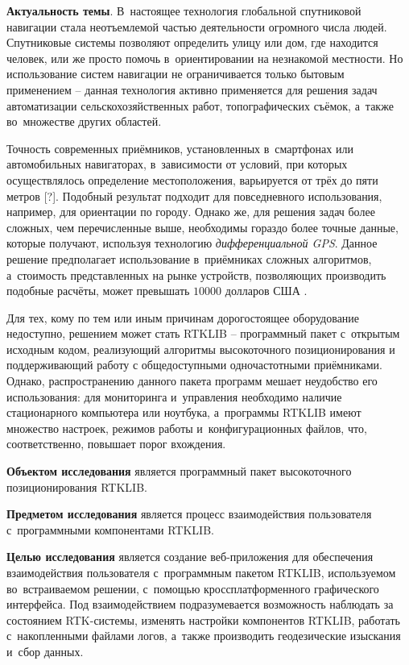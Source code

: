 
\textbf{Актуальность темы}. В~настоящее технология глобальной спутниковой навигации стала неотъемлемой частью деятельности огромного числа людей. Спутниковые системы позволяют определить улицу или дом, где находится человек, или же просто помочь в~ориентировании на незнакомой местности. Но использование систем навигации не ограничивается только бытовым применением -- данная технология активно применяется для решения задач автоматизации сельскохозяйственных работ, топографических съёмок, а~также во~множестве других областей.

Точность современных приёмников, установленных в~смартфонах или автомобильных навигаторах, в~зависимости от условий, при которых осуществлялось определение местоположения, варьируется от трёх до пяти метров [?]. Подобный результат подходит для повседневного использования, например, для ориентации по городу. Однако же, для решения задач более сложных, чем перечисленные выше, необходимы гораздо более точные данные, которые получают, используя технологию \textit{дифференциальной GPS}. Данное решение предполагает использование в~приёмниках сложных алгоритмов, а~стоимость представленных на рынке устройств, позволяющих производить подобные расчёты, может превышать $10000$ долларов США \cite{GEOOPTIC,JAVAD}.

Для тех, кому по тем или иным причинам дорогостоящее оборудование недоступно, решением может стать RTKLIB \cite{RTKLIB} -- программный пакет с~открытым исходным кодом, реализующий алгоритмы высокоточного позиционирования и поддерживающий работу с общедоступными одночастотными приёмниками. Однако, распространению данного пакета программ мешает неудобство его использования: для мониторинга и~управления необходимо наличие стационарного компьютера или ноутбука, а~программы RTKLIB имеют множество настроек, режимов работы и~конфигурационных файлов, что, соответственно, повышает порог вхождения.

\textbf{Объектом исследования} является программный пакет высокоточного позиционирования RTKLIB.

\textbf{Предметом исследования} является процесс взаимодействия пользователя с~программными компонентами RTKLIB.

\textbf{Целью исследования} является создание веб-приложения для обеспечения взаимодействия пользователя с~программным пакетом RTKLIB, используемом во~встраиваемом решении, с~помощью кроссплатформенного графического интерфейса. Под взаимодействием подразумевается возможность наблюдать за состоянием RTK-системы, изменять настройки компонентов RTKLIB, работать с~накопленными файлами логов, а~также производить геодезические изыскания и~сбор данных.

